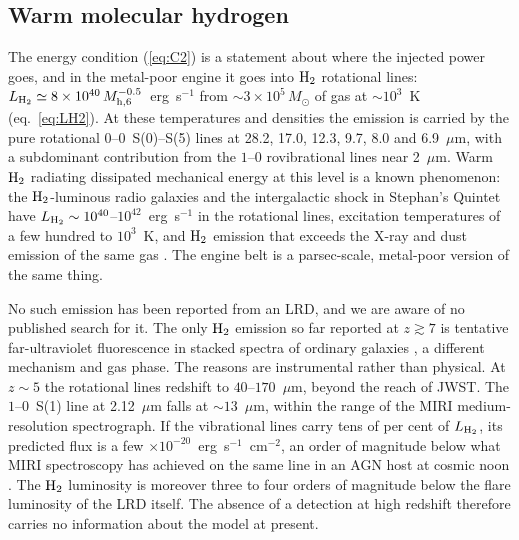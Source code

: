 \documentclass[twocolumn,pdftex]{aastex701}
\newcommand{\msun}{M_{\odot}}
\newcommand{\mhsix}{M_{\rm h,6}}
\newcommand{\Htwo}{{\rm H_2}}
\begin{document}
\subsection{Warm molecular hydrogen}\label{sec:h2emission}

The energy condition (\ref{eq:C2}) is a statement about where the injected power goes, and in the metal-poor engine it goes into $\Htwo$ rotational lines: $L_{\Htwo}\simeq8\times10^{40}\,\mhsix^{-0.5}$~erg~s$^{-1}$ from $\sim3\times10^{5}\,\msun$ of gas at $\sim10^{3}$~K (eq.~\ref{eq:LH2}). At these temperatures and densities the emission is carried by the pure rotational $0$--$0$~S(0)--S(5) lines at 28.2, 17.0, 12.3, 9.7, 8.0 and 6.9~$\mu$m, with a subdominant contribution from the $1$--$0$ rovibrational lines near 2~$\mu$m. Warm $\Htwo$ radiating dissipated mechanical energy at this level is a known phenomenon: the $\Htwo$-luminous radio galaxies and the intergalactic shock in Stephan's Quintet have $L_{\Htwo}\sim10^{40}$--$10^{42}$~erg~s$^{-1}$ in the rotational lines, excitation temperatures of a few hundred to $10^{3}$~K, and $\Htwo$ emission that exceeds the X-ray and dust emission of the same gas \citep{Appleton:2006a,Ogle:2010a,Guillard:2012a,Lanz:2015a}. The engine belt is a parsec-scale, metal-poor version of the same thing.

No such emission has been reported from an LRD, and we are aware of no published search for it. The only $\Htwo$ emission so far reported at $z\gtrsim7$ is tentative far-ultraviolet fluorescence in stacked spectra of ordinary galaxies \citep{Johnson:2025a}, a different mechanism and gas phase. The reasons are instrumental rather than physical. At $z\sim5$ the rotational lines redshift to $40$--$170$~$\mu$m, beyond the reach of JWST. The $1$--$0$~S(1) line at 2.12~$\mu$m falls at $\sim13$~$\mu$m, within the range of the MIRI medium-resolution spectrograph. If the vibrational lines carry tens of per cent of $L_{\Htwo}$, its predicted flux is a few $\times10^{-20}$~erg~s$^{-1}$~cm$^{-2}$, an order of magnitude below what MIRI spectroscopy has achieved on the same line in an AGN host at cosmic noon \citep{Kakkad:2025a}. The $\Htwo$ luminosity is moreover three to four orders of magnitude below the flare luminosity of the LRD itself. The absence of a detection at high redshift therefore carries no information about the model at present.
\end{document}
